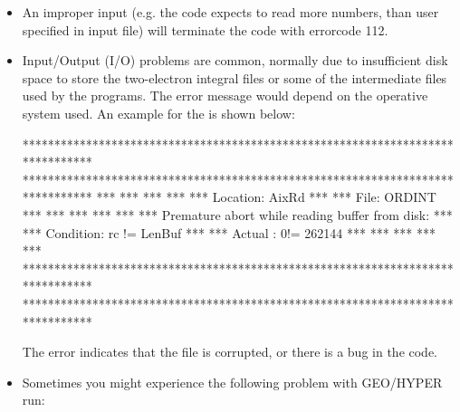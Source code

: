 \begin{itemize}

\item An improper input (e.g. the code expects to read more numbers, than 
user specified in input file) will terminate the code with errorcode 112.


\item Input/Output (I/O) problems are common, normally due to insufficient
  disk space to store the two-electron integral files or some of the
  intermediate files used by the programs. The error message would depend
  on the operative system used. An example for the  is
  shown below:

\begin{sourcelisting}
 *******************************************************************************
 *******************************************************************************
 ***                                                                         ***
 ***                                                                         ***
 ***    Location: AixRd                                                      ***
 ***    File: ORDINT                                                         ***
 ***                                                                         ***
 ***                                                                         ***
 ***    Premature abort while reading buffer from disk:                      ***
 ***    Condition: rc != LenBuf                                              ***
 ***    Actual   :                0!=          262144                        ***
 ***                                                                         ***
 ***                                                                         ***
 *******************************************************************************
 *******************************************************************************
\end{sourcelisting}

 The error indicates that the file is corrupted, or there is a bug in the 
 code. 


\item Sometimes you might experience the following problem with GEO/HYPER
      run:


\end{itemize}
